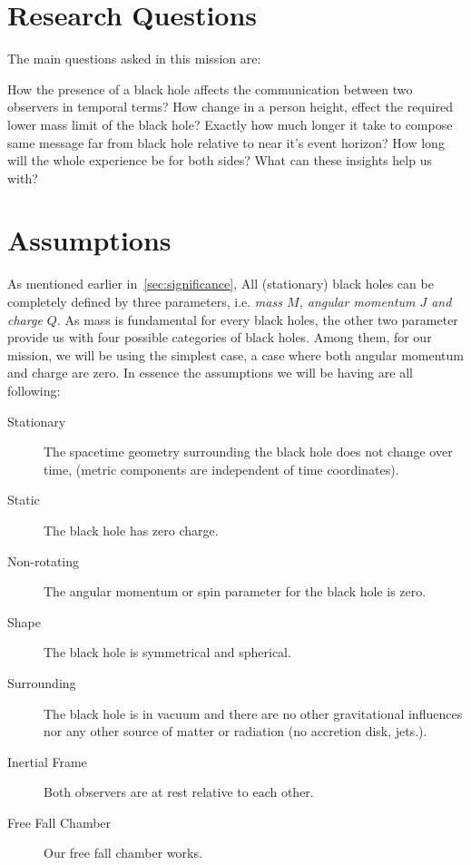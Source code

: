 \section{Research Questions}\label{sec:research-questions}

The main questions asked in this mission are:

How the presence of a black hole affects the communication between two observers in temporal terms? How change in a person height, effect the required lower mass limit of the black hole? Exactly how much longer it take to compose same message far from black hole relative to near it's event horizon? How long will the whole experience be for both sides? What can these insights help us with? 

\section{Assumptions}\label{sec:assumptions}

As mentioned earlier in~\ref{sec:significance}, All (stationary) black holes can be completely defined by three parameters, i.e. \emph{mass \(M\), angular momentum \(J\) and charge \(Q\)}. As mass is fundamental for every black holes,
the other two parameter provide us with four possible categories of black holes. Among them, for our mission, we will be using the simplest case, a case where both angular momentum and charge are zero. In essence the assumptions we will be having are all following:

\begin{description}
    \item[Stationary] The spacetime geometry surrounding the black hole does not change over time, (metric components are independent of time coordinates).
    \item[Static] The black hole has zero charge.
    \item[Non-rotating] The angular momentum or spin parameter for the black hole is zero.
    \item[Shape] The black hole is symmetrical and spherical.
    \item[Surrounding] The black hole is in vacuum and there are no other gravitational influences nor any other source of matter or radiation (no accretion disk, jets.). 
    \item[Inertial Frame] Both observers are at rest relative to each other.
    \item[Free Fall Chamber] Our free fall chamber works. 
\end{description}

